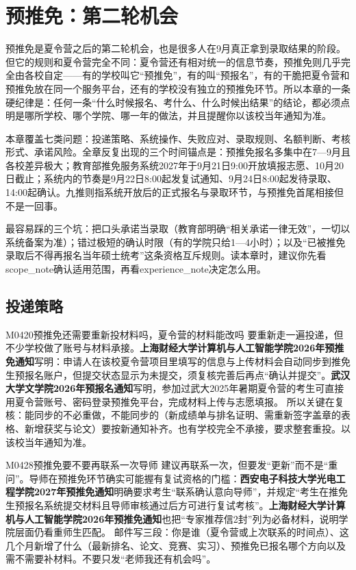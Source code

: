 \chapter{预推免：第二轮机会}
\label{ch08}
\begin{keybox}
预推免是夏令营之后的第二轮机会，也是很多人在9月真正拿到录取结果的阶段。但它的规则和夏令营完全不同：夏令营还有相对统一的信息节奏，预推免则几乎完全由各校自定——有的学校叫它“预推免”，有的叫“预报名”，有的干脆把夏令营和预推免放在同一个服务平台，还有的学校没有独立的预推免环节。所以本章的一条硬纪律是：任何一条“什么时候报名、考什么、什么时候出结果”的结论，都必须点明是哪所学校、哪个学院、哪一年的做法，并且提醒你以该校当年通知为准。

本章覆盖七类问题：投递策略、系统操作、失败应对、录取规则、名额判断、考核形式、承诺风险。全章反复出现的三个时间锚点是：预推免报名多集中在7—9月且各校差异极大；教育部推免服务系统2027年于9月21日9:00开放填报志愿、10月20日截止；系统内的节奏是9月22日8:00起发复试通知、9月24日8:00起发待录取、14:00起确认。九推则指系统开放后的正式报名与录取环节，与预推免首尾相接但不是一回事。

最容易踩的三个坑：把口头承诺当录取（教育部明确“相关承诺一律无效”，一切以系统备案为准）；错过极短的确认时限（有的学院只给1—4小时）；以及“已被推免录取后不得再报名当年硕士统考”这条资格互斥规则。读本章时，建议你先看scope\_note确认适用范围，再看experience\_note决定怎么用。
\end{keybox}

\section{投递策略}
\begin{qa}{M0420}{预推免还需要重新投材料吗，夏令营的材料能改吗}
要重新走一遍投递，但不少学校做了账号与材料承接。\textbf{上海财经大学计算机与人工智能学院2026年预推免通知}写明：申请人在该校夏令营项目里填写的信息与上传材料会自动同步到推免生预报名账户，但提交状态显示为未提交，须复核完善后再点“确认并提交”。\textbf{武汉大学文学院2026年预报名通知}写明，参加过武大2025年暑期夏令营的考生可直接用夏令营账号、密码登录预推免平台，完成材料上传与志愿填报。
所以关键在复核：能同步的不必重做，不能同步的（新成绩单与排名证明、需重新签字盖章的表格、新增获奖与论文）要按新通知补齐。也有学校完全不承接，要求整套重投。以该校当年通知为准。
\end{qa}

\begin{qa}{M0428}{预推免要不要再联系一次导师}
建议再联系一次，但要发“更新”而不是“重问”。导师在预推免环节确实可能握有复试资格的门槛：\textbf{西安电子科技大学光电工程学院2027年预推免通知}明确要求考生“联系确认意向导师”，并规定“考生在推免生预报名系统提交材料且导师审核通过后方可进行复试考核”。\textbf{上海财经大学计算机与人工智能学院2026年预推免通知}也把“专家推荐信2封”列为必备材料，说明学院层面仍看重师生匹配。
邮件写三段：你是谁（夏令营或上次联系的时间点）、这几个月新增了什么（最新排名、论文、竞赛、实习）、预推免已报名哪个方向以及需不需要补材料。不要只发“老师我还有机会吗”。
\end{qa}

